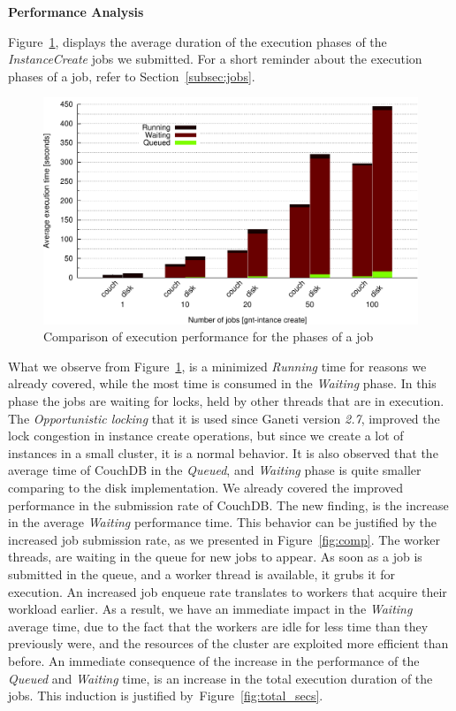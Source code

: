 \bigskip
\newpage
\textbf{Performance Analysis}

Figure~\ref{fig:jobs_avg}, displays the average duration of the execution phases
of the \emph{InstanceCreate} jobs we submitted. For a short reminder about the
execution phases of a job, refer to Section~\ref{subsec:jobs}.

\begin{figure}[htbp]
  \begin{center}
    \includegraphics[width=1.0\maxwidth]{../figures/jobs_avg.pdf}
    \caption{Comparison of execution performance for the phases of a job}
    \label{fig:jobs_avg}
  \end{center}
\end{figure}

What we observe from Figure~\ref{fig:jobs_avg}, is a minimized \emph{Running}
time for reasons we already covered, while the most time is consumed in the
\emph{Waiting} phase. In this phase the jobs are waiting for locks, held by other
threads that are in execution. The \emph{Opportunistic locking} that it is used
since Ganeti version \emph{2.7}, improved the lock congestion in instance create
operations, but since we create a lot of instances in a small cluster, it is a
normal behavior. It is also observed that the average time of CouchDB in the
\emph{Queued}, and \emph{Waiting} phase is quite smaller comparing to the disk
implementation. We already covered the improved performance in the submission
rate of CouchDB. The new finding, is the increase in the average \emph{Waiting}
performance time. This behavior can be justified by the increased job submission
rate, as we presented in Figure~\ref{fig:comp}. The worker threads, are waiting
in the queue for new jobs to appear. As soon as a job is submitted in the queue,
and a worker thread is available, it grubs it for execution. An increased job
enqueue rate translates to workers that acquire their workload earlier. As a
result, we have an immediate impact in the \emph{Waiting} average time, due to
the fact that the workers are idle for less time than they previously were, and
the resources of the cluster are exploited more efficient than before. An
immediate consequence of the increase in the performance of the \emph{Queued}
and \emph{Waiting} time, is an increase in the total execution duration of the
jobs. This induction is justified by~Figure~\ref{fig:total_secs}.

